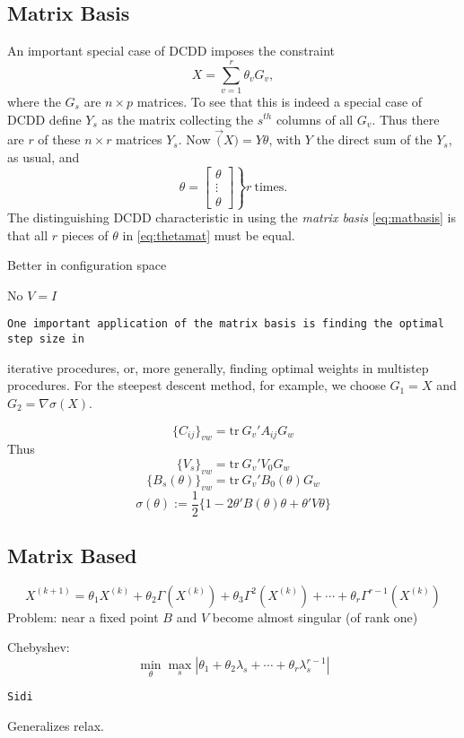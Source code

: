 \documentclass[
  12pt,
]{article}
\begin{document}
\subsection{Matrix Basis}\label{matrix-basis}

An important special case of DCDD imposes the constraint
\begin{equation}
X=\sum_{v=1}^r\theta_vG_v,
\label{eq:matbasis}
 \end{equation}
where the \(G_s\) are \(n\times p\) matrices. To see that this is indeed a special case
of DCDD define \(Y_s\) as the matrix collecting the \(s^{th}\) columns of all \(G_v\). Thus
there are \(r\) of these \(n\times r\) matrices \(Y_s\). Now \(\vec(X)=Y\theta\), with \(Y\)
the direct sum of the \(Y_s\), as usual, and
\begin{equation}
 \theta=\left.\begin{bmatrix}\theta\\\vdots\\\theta\end{bmatrix}\right\}r\ \text{times}.
\label{eq:thetamat}
  \end{equation}
The distinguishing DCDD characteristic in using the \emph{matrix basis} \eqref{eq:matbasis} is that all \(r\) pieces of \(\theta\) in \eqref{eq:thetamat} must be equal.

Better in configuration space

No \(V=I\)

\begin{verbatim}
One important application of the matrix basis is finding the optimal step size in
\end{verbatim}

iterative procedures, or, more generally, finding optimal weights in multistep
procedures. For the steepest descent method, for example, we choose \(G_1=X\)
and \(G_2=\nabla\sigma(X)\).

\[
    \{C_{ij}\}_{vw}=\text{tr}\ G_v'A_{ij}G_w
\]
Thus
\[
\{V_s\}_{vw}=\text{tr}\ G_v'V_0G_w
  \]
\[
    \{B_s(\theta)\}_{vw}=\text{tr}\ G_v'B_0(\theta)G_w
\]
\[\sigma(\theta):=\frac12\{1-2\theta'B(\theta)\theta+\theta'V\theta\}\]

\subsection{Matrix Based}\label{matrix-based}

\[
  X^{(k+1)}=\theta_1 X^{(k)}+\theta_2\Gamma(X^{(k)})+\theta_3\Gamma^2(X^{(k)})+\cdots+\theta_r\Gamma^{r-1}(X^{(k)})
  \]
Problem: near a fixed point \(B\) and \(V\) become almost singular (of rank one)

Chebyshev: \[\min_\theta\max_s|\theta_1+\theta_2\lambda_s+\cdots+\theta_r\lambda_s^{r-1}|\]

\begin{verbatim}
Sidi
\end{verbatim}

Generalizes relax.
\end{document}
